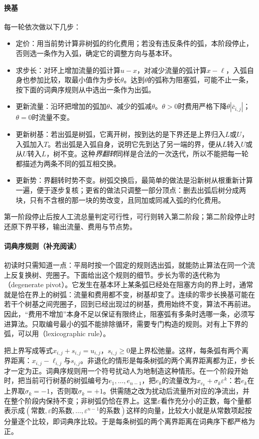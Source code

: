 \paragraph{换基}
每一轮依次做以下几步：
\begin{itemize}
  \item 定价：用当前势计算非树弧的约化费用；若没有违反条件的弧，本阶段停止，否则选一条作为入弧，确定它的调整方向与基本环。
  \item 求步长：对环上增加流量的弧计算$u-x$，对减少流量的弧计算$x-\ell$，入弧自身也参加比较，取最小值作为步长$\theta$。达到$\theta$的弧称为阻塞弧，可能不止一条，按下面的词典序规则从中选出一条作为出弧。
  \item 更新流量：沿环把增加的弧加$\theta$、减少的弧减$\theta$。$\theta>0$时费用严格下降$\theta|\bar c_{i,j}|$；$\theta=0$时流量不变。
  \item 更新树基：若出弧是树弧，它离开树，按到达的是下界还是上界归入$L$或$U$，入弧加入$T$。若出弧是入弧自身，说明它先到达了另一端的界，便从$L$转入$U$或从$U$转入$L$，树不变。这种\emph{界翻转}同样是合法的一次迭代，所以不能把每一轮都描述为两条不同的弧互相交换。
  \item 更新势：界翻转时势不变。树弧交换后，最简单的做法是沿新树从根重新计算一遍，便于逐步复核；更省的做法只调整一部分顶点：删去出弧后树分成两块，只有不含根的那一块的势改变，且同加或同减入弧的约化费用。
\end{itemize}
第一阶段停止后按人工流总量判定可行性，可行则转入第二阶段；第二阶段停止时还原下界平移，输出流量、费用与节点势。

\paragraph{词典序规则（补充阅读）}
初读时只需知道一点：平局时按一个固定的规则选出弧，就能防止算法在同一个流上反复换树、兜圈子。下面给出这个规则的细节。步长为零的迭代称为（degenerate pivot）。它发生在基本环上某条弧已经处在阻塞方向的界上时，通常就是恰在界上的树弧：流量和费用都不变，树基却变了。连续的零步长换基可能在若干个树基之间兜圈子，回到已经出现过的树基，费用始终不变，算法不再前进。因此，“费用不增加”本身不足以保证有限终止，阻塞弧有多条时选哪一条，必须写进算法。只取编号最小的弧不能排除循环，需要专门构造的规则。对有上下界的弧，可以用（lexicographic rule）。

把上界写成等式$x_{i,j}+s_{i,j}=u_{i,j}$，$s_{i,j}\geq0$是上界松弛量。这样，每条弧有两个离界距离：$x_{i,j}-\ell_{i,j}$与$s_{i,j}$。非退化的情形是每条树弧的两个离界距离都为正，步长才一定为正。词典序规则用一个符号扰动人为地制造这种情形。在一个阶段开始时，把当前可行树基的树弧编号为$e_1,\ldots,e_{n-1}$，把$e_k$的流量改为$x_{e_k}+\sigma_k\varepsilon^k$：若$e_k$在上界取$\sigma_k=-1$，否则取$\sigma_k=+1$。供需随之改为扰动后流量所对应的净流出，并在整个阶段内保持不变；非树弧仍恰在界上。这里$\varepsilon$看作充分小的正数，每个量都表示成$(\text{常数},\varepsilon\text{的系数},\ldots,\varepsilon^{n-1}\text{的系数})$这样的向量，比较大小就是从常数项起按分量逐个比较，即词典序比较。于是每条树弧的两个离界距离在词典序下都严格为正。

